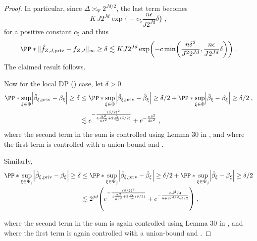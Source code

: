\documentclass{article}
\newcommand{\1}{\mathds{1}}
\DeclarePairedDelimiter{\abs}{\lvert}{\rvert}
\DeclarePairedDelimiter{\paren}{\lparen}{\rparen}
\theoremstyle{plain}
\theoremstyle{definition}
\theoremstyle{remark}
\begin{document}
\begin{proof}
In particular, since $\Delta \asymp_{\Psi} 2^{Jd/2}$, the last term becomes
\begin{equation}
    K\,J2^{Jd}\exp\!\Big\{-c_5 \frac{n\epsilon}{J2^{Jd}}\delta\Big\} \;,
\end{equation}
for a positive constant $c_5$ and thus 
\begin{equation}
\label{eq:linfty-simple_2}
\PP*{\| \hat{f}_{Z, J, \textrm{priv}} - f_{Z, J} \|_{\infty} \geq \delta}
\lesssim
K J 2^{Jd} \exp \paren*{-c \min \paren*{\frac{n\delta^2}{J^2 2^{Jd}}, \frac{n\epsilon}{J 2^{Jd}} \delta}} \;.
\end{equation}
The claimed result follows.

Now for the local DP () case, let $\delta > 0$.
\begin{equation}
\begin{aligned}
    \PP*{\sup_{\xi \in \Phi} \abs*{\hat{\beta}_{\xi, \textrm{priv}} - {\beta}_{\xi}} \geq \delta} 
    &\leq 
    \PP*{\sup_{\xi \in \Phi} \abs*{\hat{\beta}_{\xi, \textrm{priv}} - \hat{\beta}_{\xi}} \geq \delta/2} 
    +
    \PP*{\sup_{\xi \in \Phi} \abs*{\hat{\beta}_{\xi} - {\beta}_{\xi}} \geq \delta/2}\;,\\
    &\lesssim e^{-\frac{(\delta/2)^2}{4\frac{\Delta^2}{n \epsilon^2} + 2\frac{\Delta}{n \epsilon} (\delta/2)}} +  e^{- \frac{n \delta^2}{4a^2}}  \;,
\end{aligned}
\end{equation}
where the second term in the sum is controlled using Lemma 30 in \cite{Manole2024Plugin}, and where the first term is controlled with a union-bound and .

Similarly, 
\begin{equation}
\begin{aligned}
    \PP*{\sup_{\xi \in \Psi_j} \abs*{\hat{\beta}_{\xi, \textrm{priv}} - {\beta}_{\xi}} \geq \delta} 
    &\leq 
    \PP*{\sup_{\xi \in \Psi_j} \abs*{\hat{\beta}_{\xi, \textrm{priv}} - \hat{\beta}_{\xi}} \geq \delta/2} +
    \PP*{\sup_{\xi \in \Psi_j} \abs*{\hat{\beta}_{\xi} - {\beta}_{\xi}} \geq \delta/2} \\
    &\lesssim 2^{jd} \paren*{e^{-\frac{(\delta/2)^2}{4\frac{\Delta^2}{n \epsilon^2} + 2\frac{\Delta}{n \epsilon} (\delta/2)}} + e^{- \frac{n \delta^2 / 4}{b+2^{jd/2} b \delta/2}} }\;,
\end{aligned}
\end{equation}

where the second term in the sum is again controlled using Lemma 30 in \cite{Manole2024Plugin}, and where the first term is again controlled with a union-bound and .


\end{proof}
\end{document}
